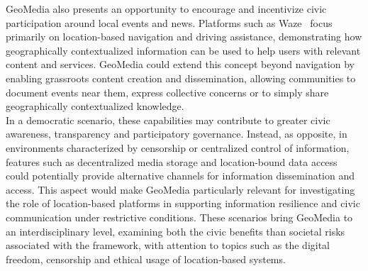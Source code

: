 GeoMedia also presents an opportunity to encourage and incentivize civic participation around local events and news. Platforms such as Waze~\cite{site:waze} focus primarily on location-based navigation and driving assistance, demonstrating how geographically contextualized information can be used to help users with relevant content and services. GeoMedia could extend this concept beyond navigation by enabling grassroots content creation and dissemination, allowing communities to document events near them, express collective concerns or to simply share geographically contextualized knowledge.\\
In a democratic scenario, these capabilities may contribute to greater civic awareness, transparency and participatory governance. Instead, as opposite, in environments characterized by censorship or centralized control of information, features such as decentralized media storage and location-bound data access could potentially provide alternative channels for information dissemination and access. This aspect would make GeoMedia particularly relevant for investigating the role of location-based platforms in supporting information resilience and civic communication under restrictive conditions. These scenarios bring GeoMedia to an interdisciplinary level, examining both the civic benefits than societal risks associated with the framework, with attention to topics such as the digital freedom, censorship and ethical usage of location-based systems.


